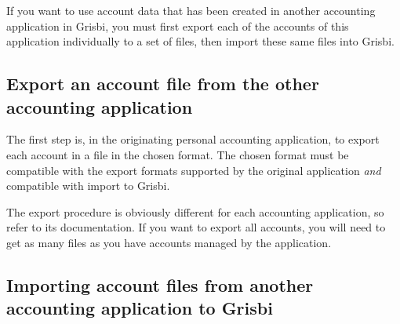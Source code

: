 If you want to use account data that has been created in another accounting application in Grisbi, you must first export each of the accounts of this application individually to a set of files, then import these same files into Grisbi.


\subsection{Export an account file from the other accounting application\label{importexport-import-exportinit}}

The first step is, in the originating personal accounting application, to export each account in a file in the chosen format. The chosen format must be compatible with the export formats supported by the original application \emph{and} compatible with import to Grisbi.

The export procedure is obviously different for each accounting application, so refer to its documentation. If you want to export all accounts, you will need to get as many files as you have accounts managed by the application.


\subsection{Importing account files from another accounting application to Grisbi\label{importexport-import-importinit}}


